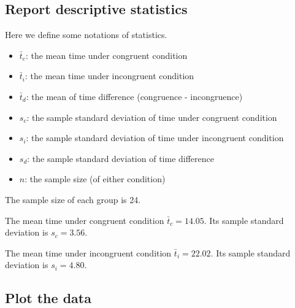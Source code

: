 \documentclass[paper=a4, fontsize=11pt]{scrartcl} %
\numberwithin{equation}{section} %
\numberwithin{figure}{section} %
\numberwithin{table}{section} %
\begin{document}
\subsection{Report descriptive statistics}
\medskip
\noindent{}
\medskip

Here we define some notations of statistics.

\begin{itemize}
    \item $\bar{t}_c$: the mean time under congruent condition
    \item $\bar{t}_i$: the mean time under incongruent condition
    \item $\bar{t}_d$: the mean of time difference
        (congruence - incongruence)
    \item $s_c$: the sample standard deviation of time under
        congruent condition
    \item $s_i$: the sample standard deviation of time under
        incongruent condition
    \item $s_d$: the sample standard deviation of time difference
    \item $n$: the sample size (of either condition)
\end{itemize}

The sample size of each group is 24.

The mean time under congruent condition $\bar{t}_c = 14.05$.
Its sample standard deviation is $s_c = 3.56$.

The mean time under incongruent condition $\bar{t}_i = 22.02$.
Its sample standard deviation is $s_i = 4.80$.

\subsection{Plot the data}
\medskip
\noindent{}
\medskip
\end{document}
